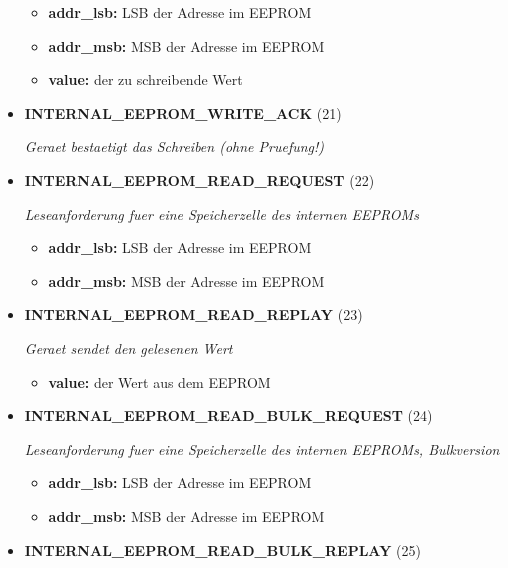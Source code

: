\begin{itemize}
\small
\begin{itemize}
		
\item \textbf{addr\_lsb:} LSB der Adresse im EEPROM
\item \textbf{addr\_msb:} MSB der Adresse im EEPROM
\item \textbf{value:} der zu schreibende Wert
\end{itemize}
\normalsize
	
\item \textbf{INTERNAL\_EEPROM\_WRITE\_ACK} (21)

\textit{Geraet bestaetigt das Schreiben (ohne Pruefung!)}

\item \textbf{INTERNAL\_EEPROM\_READ\_REQUEST} (22)

\textit{Leseanforderung fuer eine Speicherzelle des internen EEPROMs}

\small
\begin{itemize}
		
\item \textbf{addr\_lsb:} LSB der Adresse im EEPROM
\item \textbf{addr\_msb:} MSB der Adresse im EEPROM
\end{itemize}
\normalsize
	
\item \textbf{INTERNAL\_EEPROM\_READ\_REPLAY} (23)

\textit{Geraet sendet den gelesenen Wert}

\small
\begin{itemize}
		
\item \textbf{value:} der Wert aus dem EEPROM
\end{itemize}
\normalsize
	
\item \textbf{INTERNAL\_EEPROM\_READ\_BULK\_REQUEST} (24)

\textit{Leseanforderung fuer eine Speicherzelle des internen EEPROMs, Bulkversion}

\small
\begin{itemize}
		
\item \textbf{addr\_lsb:} LSB der Adresse im EEPROM
\item \textbf{addr\_msb:} MSB der Adresse im EEPROM
\end{itemize}
\normalsize
	
\item \textbf{INTERNAL\_EEPROM\_READ\_BULK\_REPLAY} (25)


\end{itemize}
